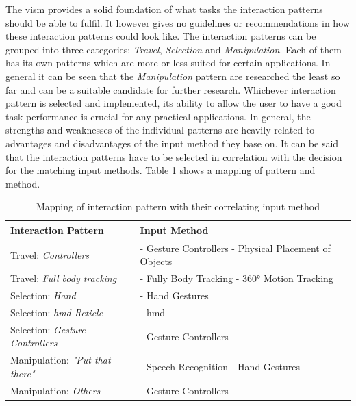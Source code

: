 The \gls{vism} provides a solid foundation of what tasks the interaction patterns should be able to fulfil. It however gives no guidelines or recommendations in how these interaction patterns could look like. The interaction patterns can be grouped into three categories: \textit{Travel}, \textit{Selection} and \textit{Manipulation}. Each of them has its own patterns which are more or less suited for certain applications. In general it can be seen that the \textit{Manipulation} pattern are researched the least so far and can be a suitable candidate for further research. Whichever interaction pattern is selected and implemented, its ability to allow the user to have a good task performance is crucial for any practical applications. \newline
In general, the strengths and weaknesses of the individual patterns are heavily related to advantages and disadvantages of the input method they base on. It can be said that the interaction patterns have to be selected in correlation with the decision for the matching input methods. Table \ref{tbl:pattermethodmapping} shows a mapping of pattern and method.
\begin{table}[t]
	\begin{center}
		\begin{tabular}{ | p{4cm} | p{6cm} | } 
			\hline
			\textbf{Interaction Pattern} & \textbf{Input Method} \\
			\hline
			Travel:  \newline \textit{Controllers} &
			- Gesture Controllers \newline - Physical Placement of Objects \\
			\hline
			Travel: \newline \textit{Full body tracking} &
			- Fully Body Tracking \newline - 360° Motion Tracking \\
			\hline
			Selection: \newline \textit{Hand} & 
			- Hand Gestures \\
			\hline
			Selection: \newline \textit{\gls{hmd} Reticle} &
			- \gls{hmd} \\
			\hline
			Selection: \newline \textit{Gesture Controllers} &
			- Gesture Controllers \\ 
			\hline
			Manipulation: \newline \textit{"Put that there"} &
			- Speech Recognition \newline - Hand Gestures \\ 
			\hline
			Manipulation: \newline \textit{Others} &
			- Gesture Controllers \\ 
			\hline
		\end{tabular}
		\caption{Mapping of interaction pattern with their correlating input method}
		\label{tbl:pattermethodmapping}
	\end{center}
\end{table}

